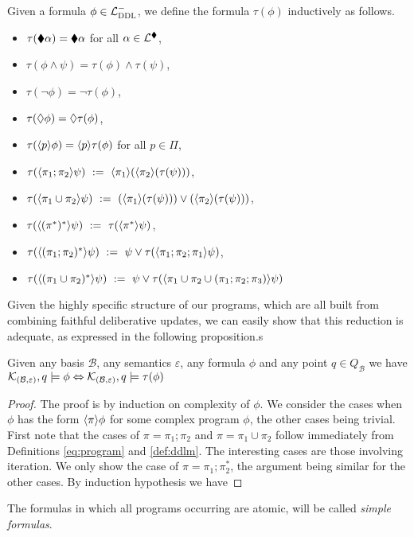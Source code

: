 \documentclass{llncs}
\newcommand{\dlangm}{{\mathcal L}_{\acro{DDL}}^{-}}
\newcommand{\carriers}[1]{Q_{#1}}
\newcommand{\kmod}[2]{{\cal K}_{(#1,#2)}}
\newcommand{\views}{\mathcal B}
\newcommand{\sem}{\varepsilon}
\begin{document}
\begin{definition}\label{def:nfprog}
Given a formula $\phi \in \dlangm$, we define the formula $\tau(\phi)$ inductively as follows.
\begin{itemize} 
\item $\tau(\blacklozenge \alpha) = \blacklozenge \alpha$ for all $\alpha \in \mathcal L^{\blacklozenge}$,
\item $\tau(\phi \land \psi) = \tau(\phi) \land \tau(\psi)$,
\item $\tau(\neg \phi) = \neg \tau(\phi)$,
\item $\tau(\lozenge \phi) = \lozenge \tau(\phi)$,
\item $\tau(\langle{p}\rangle \phi) = \langle{p}\rangle \tau(\phi)$ for all $p \in \Pi$,
\item $\tau(\langle{\pi_1;\pi_2}\rangle \psi) ~:=~ \langle{\pi_1}\rangle(\langle{\pi_2}\rangle(\tau(\psi)))$, 
\item $\tau(\langle{\pi_1 \cup \pi_2}\rangle \psi) ~:=~ (\langle{\pi_1}\rangle (\tau(\psi))) \vee  (\langle{\pi_2}\rangle(\tau(\psi)))$,
\item $\tau(\langle{(\pi^*)^*}\rangle\psi) ~:=~ \tau(\langle{\pi^*}\rangle\psi)$,
\item $\tau(\langle{(\pi_1;\pi_2)^*}\rangle\psi) ~:=~ \psi \vee \tau(\langle{\pi_1;\pi_2;\pi_1}\rangle \psi)$,
\item $\tau(\langle{(\pi_1 \cup \pi_2)^*}\rangle \psi) ~:=~ \psi \vee \tau(\langle{\pi_1 \cup \pi_2 \cup (\pi_1 ;\pi_2;\pi_3)}\rangle \psi)$
\end{itemize}
\end{definition} 

Given the highly specific structure of our programs, which are all built from combining faithful deliberative updates, we can easily show that this reduction is adequate, as expressed in the following proposition.s

\begin{proposition}\label{prop:nfprog}
Given any basis $\views$, any semantics $\sem$, any formula $\phi$ and any point $q \in \carriers \views$ we have $\kmod \views \sem, q \models \phi \Leftrightarrow \kmod \views \sem, q \models \tau(\phi)$
\end{proposition}

\begin{proof}
The proof is by induction on complexity of $\phi$. We consider the cases when $\phi$ has the form $\langle{\pi}\rangle \phi$ for some complex program $\phi$, the other cases being trivial. First note that the cases of $\pi = \pi_1;\pi_2$ and $\pi = \pi_1 \cup \pi_2$ follow immediately from Definitions \ref{eq:program} and \ref{def:ddlm}. The interesting cases are those involving iteration. We only show the case of $\pi = \pi_1;\pi_2^\ast$, the argument being similar for the other cases. By induction hypothesis we have 

\end{proof}
The formulas in which all programs occurring are atomic, will be called \emph{simple formulas}. 
\end{document}
